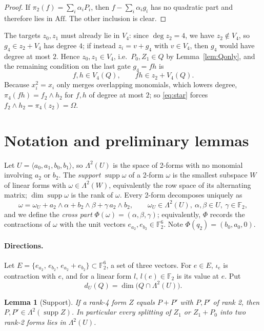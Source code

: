 \documentclass[11pt,a4paper]{article}
\theoremstyle{plain}
\newtheorem{lemma}[theorem]{Lemma}
\theoremstyle{definition}
\theoremstyle{remark}
\newcommand{\F}{\mathbb{F}_2}
\newcommand{\Aff}{\mathrm{Aff}}
\newcommand{\supp}{\operatorname{supp}}
\newcommand{\Lam}{\Lambda^{2}}
\newcommand{\dU}{d_U}
\newcommand{\Dir}{E}
\begin{document}
\begin{proof}
If $\pi_2(f)=\sum_i\alpha_iP_i$, then $f-\sum_i\alpha_ig_i$ has no quadratic part and therefore lies in $\Aff$. The other inclusion is clear.
\end{proof}

The targets $z_0,z_1$ must already lie in $V_4$: since $\deg z_2=4$, we have $z_2\notin V_4$, so $g_4\in z_2+V_4$ has degree $4$; if instead $z_i=v+g_4$ with $v\in V_4$, then $g_4$ would have degree at most $2$. Hence $z_0,z_1\in V_4$, i.e.\ $P_0,Z_1\in Q$ by Lemma~\ref{lem:Qonly}, and the remaining condition on the last gate $g_4=fh$ is
\begin{equation}\label{eq:star}
  f,h\in V_4(Q),\qquad fh\in z_2+V_4(Q).
\end{equation}
Because $x_i^2=x_i$ only merges overlapping monomials, which lowers degree, $\pi_4(fh)=f_2\wedge h_2$ for $f,h$ of degree at most $2$; so \eqref{eq:star} forces $f_2\wedge h_2=\pi_4(z_2)=\Omega$.

\section{Notation and preliminary lemmas}

Let $U=\langle a_0,a_1,b_0,b_1\rangle$, so $\Lam(U)$ is the space of 2-forms with no monomial involving $a_2$ or $b_2$. The \emph{support} $\supp\omega$ of a 2-form $\omega$ is the smallest subspace $W$ of linear forms with $\omega\in\Lam(W)$, equivalently the row space of its alternating matrix; $\dim\supp\omega$ is the rank of $\omega$. Every 2-form decomposes uniquely as
\[
  \omega=\omega_U+a_2\wedge\alpha+b_2\wedge\beta+\gamma\,a_2\wedge b_2,\qquad \omega_U\in\Lam(U),\ \alpha,\beta\in U,\ \gamma\in\F,
\]
and we define the \emph{cross part} $\Phi(\omega)=(\alpha,\beta,\gamma)$; equivalently, $\Phi$ records the contractions of $\omega$ with the unit vectors $e_{a_2},e_{b_2}\in\F^6$. Note $\Phi(q_2)=(b_0,a_0,0)$.

\paragraph{Directions.} Let $\Dir=\{e_{a_2},\,e_{b_2},\,e_{a_2}+e_{b_2}\}\subset\F^6$, a set of three vectors. For $e\in\Dir$, $\iota_e$ is contraction with $e$, and for a linear form $l$, $l(e)\in\F$ is its value at $e$. Put
\[
  \dU(Q)=\dim\bigl(Q\cap\Lam(U)\bigr).
\]

\begin{lemma}[Support]\label{lem:support}
If a rank-4 form $Z$ equals $P+P'$ with $P,P'$ of rank 2, then $P,P'\in\Lam(\supp Z)$. In particular every splitting of $Z_1$ or $Z_1+P_0$ into two rank-2 forms lies in $\Lam(U)$.
\end{lemma}
\end{document}
